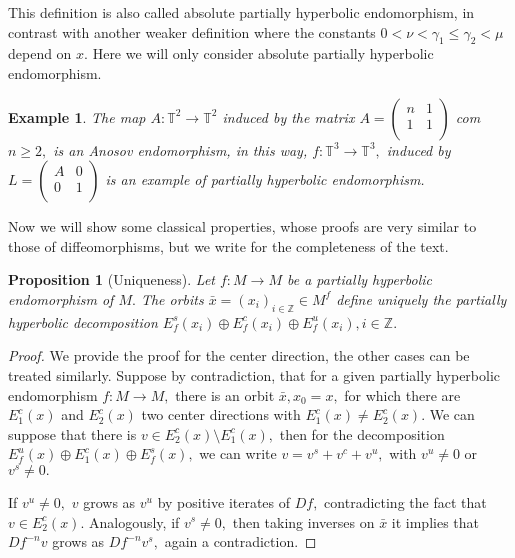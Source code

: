 \documentclass[12pt,reqno]{amsart}
\numberwithin{equation}{section}
\theoremstyle{plain}
\newtheorem{proposition}[theorem]{Proposition}
\newtheorem{example}{Example}
\theoremstyle{remark}
\begin{document}
This definition is also called absolute partially hyperbolic endomorphism, in contrast with another weaker definition where the constants \mbox{$0<\nu<\gamma_1\leq\gamma_2<\mu$} depend on $x.$ Here we will only consider absolute partially hyperbolic endomorphism.




\begin{example}
The map $A: \mathbb{T}^2 \rightarrow \mathbb{T}^2  $ induced by the matrix
$A=
\left(
  \begin{array}{cc}
    n & 1 \\
    1 & 1 \\
  \end{array}
\right)$
com $n\geq 2,$ is an Anosov endomorphism, in this way,
$f: \mathbb{T}^3 \rightarrow \mathbb{T}^3, $ induced by  $ L=
\left(
  \begin{array}{cc}
    A & 0 \\
     0  & 1 \\
  \end{array}
\right)$
is an example of partially hyperbolic endomorphism.
\end{example}


Now we will show some classical properties, whose proofs are very similar to those of diffeomorphisms, but we write for the completeness of the text.



\begin{proposition}[Uniqueness]\label{uniqueness}
Let $f:M \rightarrow M$ be a partially hyperbolic endomorphism of $M.$ The orbits  $\bar{x} = (x_i)_{i \in \mathbb{Z}}\in M^f$ define uniquely the partially hyperbolic decomposition $E^s_f(x_i) \oplus E^c_f(x_i) \oplus  E^u_f(x_i), i \in \mathbb{Z}.$
\end{proposition}

\begin{proof}
We provide the proof for the center direction, the other cases can be treated similarly. Suppose by contradiction, that for a given partially hyperbolic endomorphism $f:M\rightarrow M,$ there is an orbit $\bar{x}, x_0 = x,$ for which there are  $E^c_1(x)$ and $E^c_2(x)$  two center directions with $E^c_1(x) \neq E^c_2(x).$ We can suppose that there is $v\in E^c_2(x)\setminus E^c_1(x),$ then for the decomposition $E^u_f(x)\oplus E^c_1(x)\oplus E^s_f(x),$ we can write $v=v^s+v^c+v^u,$ with $v^u\neq 0$ or $v^s\neq 0.$

If $v^u\neq 0,$ $v$ grows as $v^u$  by positive iterates of $Df,$ contradicting the fact that $v\in E^c_2(x).$ Analogously, if $v^s\neq 0,$  then taking inverses on $\bar{x}$ it implies that $Df^{-n} v$ grows as $Df^{-n}v^s,$ again a contradiction.
\end{proof}
\end{document}
